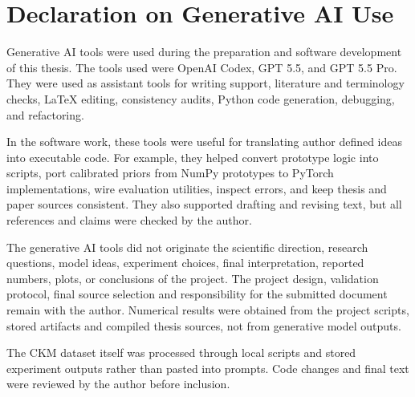 \chapter{Declaration on Generative AI Use}
\label{app:generative_ai_declaration}

Generative AI tools were used during the preparation and software development
of this thesis. The tools used were OpenAI Codex, GPT 5.5, and GPT 5.5 Pro.
They were used as assistant tools for writing support, literature and
terminology checks, LaTeX editing, consistency audits, Python code generation,
debugging, and refactoring.

In the software work, these tools were useful for translating author defined
ideas into executable code. For example, they helped convert prototype logic
into scripts, port calibrated priors from NumPy prototypes to PyTorch
implementations, wire evaluation utilities, inspect errors, and keep thesis and
paper sources consistent. They also supported drafting and revising text, but
all references and claims were checked by the author.

The generative AI tools did not originate the scientific direction, research
questions, model ideas, experiment choices, final interpretation, reported
numbers, plots, or conclusions of the project. The project design, validation
protocol, final source selection and responsibility for the submitted document
remain with the author. Numerical results were obtained from the project
scripts, stored artifacts and compiled thesis sources, not from generative model
outputs.

The CKM dataset itself was processed through local scripts and stored experiment
outputs rather than pasted into prompts. Code changes and final text were
reviewed by the author before inclusion.
